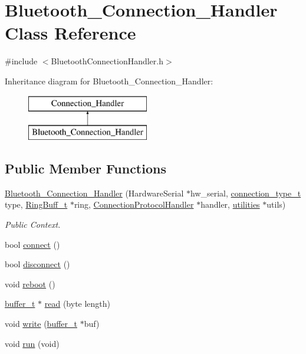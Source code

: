 \hypertarget{class_bluetooth___connection___handler}{\section{\-Bluetooth\-\_\-\-Connection\-\_\-\-Handler \-Class \-Reference}
\label{class_bluetooth___connection___handler}
}


{\ttfamily \#include $<$\-Bluetooth\-Connection\-Handler.\-h$>$}

\-Inheritance diagram for \-Bluetooth\-\_\-\-Connection\-\_\-\-Handler\-:\begin{figure}[H]
\begin{center}
\leavevmode
\includegraphics[height=2.000000cm]{class_bluetooth___connection___handler}
\end{center}
\end{figure}
\subsection*{\-Public \-Member \-Functions}
\begin{DoxyCompactItemize}
\item 
\hyperlink{class_bluetooth___connection___handler_a0732390759ba1b8d14e5ccc5e83ed2cd}{\-Bluetooth\-\_\-\-Connection\-\_\-\-Handler} (\-Hardware\-Serial $\ast$hw\-\_\-serial, \hyperlink{_connection_handler_8h_a688c9994fcf706765d41a72e7e9e39a5}{connection\-\_\-type\-\_\-t} type, \hyperlink{struct_ring_buff__t}{\-Ring\-Buff\-\_\-t} $\ast$ring, \hyperlink{class_connection_protocol_handler}{\-Connection\-Protocol\-Handler} $\ast$handler, \hyperlink{classutilities}{utilities} $\ast$utils)
\begin{DoxyCompactList}\small\item\em \-Public \-Context. \end{DoxyCompactList}\item 
bool \hyperlink{class_bluetooth___connection___handler_ada4a47ada49b62071fba9d23b63cd128}{connect} ()
\item 
bool \hyperlink{class_bluetooth___connection___handler_a35de0a32d9f48521c8e3afd30df823f5}{disconnect} ()
\item 
void \hyperlink{class_bluetooth___connection___handler_a69604d969ecc0514948314cb7b78cd1d}{reboot} ()
\item 
\hyperlink{structbuffer__t}{buffer\-\_\-t} $\ast$ \hyperlink{class_bluetooth___connection___handler_a03944d3fb682688354c132878dd3d8f0}{read} (byte length)
\item 
void \hyperlink{class_bluetooth___connection___handler_afb57232b5a23ddc1be523b9fe6b275b5}{write} (\hyperlink{structbuffer__t}{buffer\-\_\-t} $\ast$buf)
\item 
void \hyperlink{class_bluetooth___connection___handler_aeccdb22a55988eac70feb174ec10eefb}{run} (void)
\end{DoxyCompactItemize}


